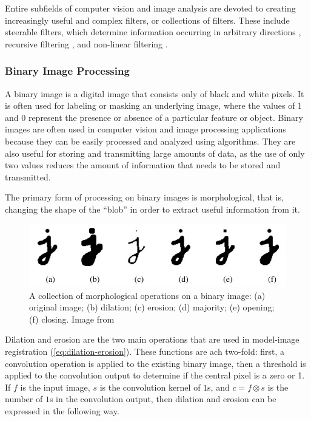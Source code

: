 Entire subfields of computer vision and image analysis are devoted to creating increasingly useful and complex filters, or collections of filters. These include steerable filters, which determine information occurring in arbitrary directions \cite{freemanSteerableFiltersLocal1992}, recursive filtering \cite{nielsenRegularizationScalespaceEdge1996}, and non-linear filtering \cite{tomasiBilateralFilteringGray1998}.

\subsubsection{Binary Image Processing}

A binary image is a digital image that consists only of black and white pixels. It is often used for labeling or masking an underlying image, where the values of 1 and 0 represent the presence or absence of a particular feature or object. Binary images are often used in computer vision and image processing applications because they can be easily processed and analyzed using algorithms. They are also useful for storing and transmitting large amounts of data, as the use of only two values reduces the amount of information that needs to be stored and transmitted.

The primary form of processing on binary images is morphological, that is, changing the shape of the ``blob'' in order to extract useful information from it.

\begin{figure}[h!]
    \includegraphics[width = \linewidth]{figs/background/png/binary-image-processing.jpg}
    \caption{A collection of morphological operations on a binary image: (a) original image; (b) dilation; (c) erosion; (d) majority; (e) opening; (f) closing. Image from \cite{szeliskiComputerVisionAlgorithms2022}}
    \label{fig:binary-image-processing}
\end{figure}

Dilation and erosion are the two main operations that are used in model-image registration (\ref{eq:dilation-erosion}). These functions are ach two-fold: first, a convolution operation is applied to the existing binary image, then a threshold is applied to the convolution output to determine if the central pixel is a zero or 1. If $f$ is the input image, $s$ is the convolution kernel of $1$s, and $c=f\otimes s$ is the number of $1$s in the convolution output, then dilation and erosion can be expressed in the following way.

